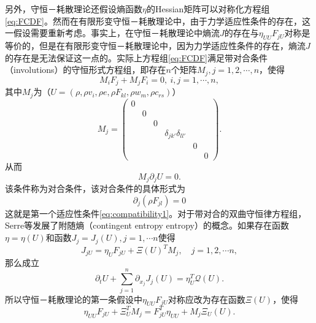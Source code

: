 
另外，守恒－耗散理论还假设熵函数$\eta$的Hessian矩阵可以对称化方程组\eqref{eq:FCDF}。然而在有限形变守恒－耗散理论中，由于力学适应性条件的存在，这一假设需要重新考虑。事实上，在守恒－耗散理论中熵流$J$的存在与$\eta_{UU}F_{jU}$对称是等价的，但是在有限形变守恒－耗散理论中，因为力学适应性条件的存在，熵流$J$的存在是无法保证这一点的。实际上方程组\eqref{eq:FCDF}满足带对合条件（involutions）的守恒形式方程组\cite{dafermos1986quasilinear,dafermos2013non,benzoni2007multi}，即存在$n$个矩阵$M_j,j=1,2,\cdots,n$，使得
\begin{equation*}
	M_i F_{j} + M_j F_i = 0, \ i,j = 1, \cdots,n ,
\end{equation*}
其中$M_j$为（$U= (\rho,\rho v_i,\rho e, \rho F_{kl},\rho w_m, \rho c_{rs})$）
\begin{equation*}
	M_{j} = \left( \begin{array}{ccccccc}
		0 \\
		& 0 \\
		& & 0 \\
		& & & \delta_{jk'}\delta_{ll'} \\
		& & & & 0 \\
		& & & & & 0
	\end{array} \right).
\end{equation*}
从而
\begin{equation}\label{eq:involutions}
	M_j \partial_j U = 0.
\end{equation}
该条件称为对合条件，该对合条件的具体形式为
\begin{equation*}
	\partial_{j} (\rho F_{jl}) = 0
\end{equation*}
这就是第一个适应性条件\eqref{eq:compatibility1}。对于带对合的双曲守恒律方程组，Serre等发展了附随熵（contingent entropy entropy）的概念\cite{benzoni2007multi}。如果存在函数$\eta = \eta(U)$和函数$J_j=J_j(U),j=1, \cdots n$使得
\begin{equation*}
	J_{jU}  = \eta_U F_{jU} + \Xi(U)^T M_j,\quad j=1,2, \cdots n,
\end{equation*}
那么成立
\begin{equation*}
	\partial_t U + \sum_{j=1}^n \partial_{x_j} J_{j}(U) = \eta_U^T \mathcal{Q}(U).
\end{equation*}
所以守恒－耗散理论的第一条假设中$\eta_{UU} F_{jU}$对称应改为存在函数$\Xi(U)$，使得
\begin{equation}\label{eq:invsym}
	\eta_{UU} F_{jU} + \Xi_U^T M_j = F_{jU}^T \eta_{UU} + M_j \Xi_U(U).
\end{equation}

